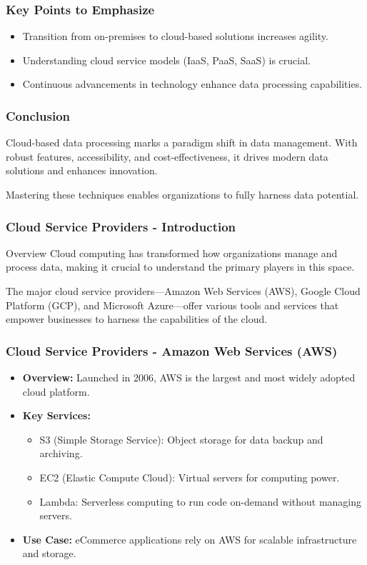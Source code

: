 \documentclass{beamer}
\begin{document}
\begin{frame}[fragile]
    \frametitle{Key Points to Emphasize}
    \begin{itemize}
        \item Transition from on-premises to cloud-based solutions increases agility.
        \item Understanding cloud service models (IaaS, PaaS, SaaS) is crucial.
        \item Continuous advancements in technology enhance data processing capabilities.
    \end{itemize}
\end{frame}

\begin{frame}[fragile]
    \frametitle{Conclusion}
    Cloud-based data processing marks a paradigm shift in data management. With robust features, accessibility, and cost-effectiveness, it drives modern data solutions and enhances innovation.
    
    Mastering these techniques enables organizations to fully harness data potential.
\end{frame}

\begin{frame}[fragile]
    \frametitle{Cloud Service Providers - Introduction}
    \begin{block}{Overview}
        Cloud computing has transformed how organizations manage and process data, making it crucial to understand the primary players in this space. 
    \end{block}
    The major cloud service providers—Amazon Web Services (AWS), Google Cloud Platform (GCP), and Microsoft Azure—offer various tools and services that empower businesses to harness the capabilities of the cloud.
\end{frame}

\begin{frame}[fragile]
    \frametitle{Cloud Service Providers - Amazon Web Services (AWS)}
    \begin{itemize}
        \item \textbf{Overview:} Launched in 2006, AWS is the largest and most widely adopted cloud platform.
        \item \textbf{Key Services:}
        \begin{itemize}
            \item S3 (Simple Storage Service): Object storage for data backup and archiving.
            \item EC2 (Elastic Compute Cloud): Virtual servers for computing power.
            \item Lambda: Serverless computing to run code on-demand without managing servers.
        \end{itemize}
        \item \textbf{Use Case:} eCommerce applications rely on AWS for scalable infrastructure and storage.
    \end{itemize}
\end{frame}
\end{document}

